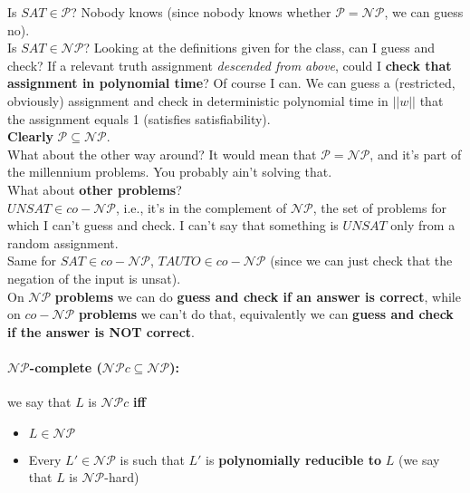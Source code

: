 \documentclass[11pt]{article}
\begin{document}
	Is $SAT \in \mathcal{P}$? Nobody knows (since nobody knows whether $\mathcal{P} = \mathcal{NP}$, we can guess no).\\
	
	Is $SAT \in \mathcal{NP}$? Looking at the definitions given for the class, can I guess and check? If a relevant truth assignment \textit{descended from above}, could I \textbf{check that assignment in polynomial time}? Of course I can. We can guess a (restricted, obviously) assignment and check in deterministic polynomial time in $||w||$ that the assignment equals 1 (satisfies satisfiability).\\
	
	\textbf{Clearly} $\mathcal{P} \subseteq \mathcal{NP}$.\\
	What about the other way around? It would mean that $\mathcal{P} = \mathcal{NP}$, and it's part of the millennium problems. You probably ain't solving that.\\
	
	What about \textbf{other problems}? \\
	
	$UNSAT \in co-\mathcal{NP}$, i.e., it's in the complement of $\mathcal{NP}$, the set of problems for which I can't guess and check. I can't say that something is $UNSAT$ only from a random assignment.\\
	Same for $SAT \in co-\mathcal{NP}$, $TAUTO \in co-\mathcal{NP}$ (since we can just check that the negation of the input is unsat).\\
	
	On $\mathcal{NP}$ \textbf{problems} we can do \textbf{guess and check if an answer is correct}, while on $co-\mathcal{NP}$ \textbf{problems} we can't do that, equivalently we can \textbf{guess and check if the answer is NOT correct}.\\
	
	
	\paragraph{$\mathcal{NP}$-complete ($\mathcal{NP}c \subseteq \mathcal{NP}$):} we say that $L$ is $\mathcal{NP}c$ \textbf{iff}
	\begin{itemize}
		\item $L \in \mathcal{NP}$
		\item Every $L' \in \mathcal{NP}$ is such that $L'$ is \textbf{polynomially reducible to} $L$ (we say that $L$ is $\mathcal{NP}$-hard)
	\end{itemize}
	
\end{document}
